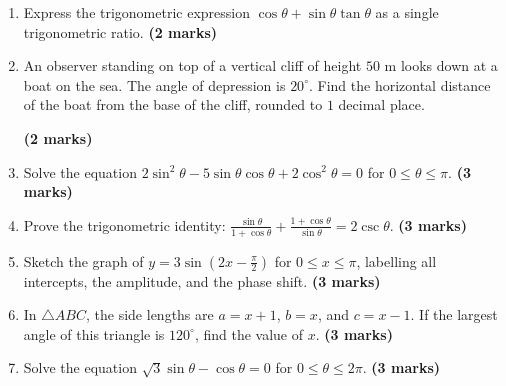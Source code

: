 \documentclass{article}
\begin{document}
\begin{enumerate}
    \item Express the trigonometric expression $\cos\theta + \sin\theta\tan\theta$ as a single trigonometric ratio. \hfill \textbf{(2 marks)}
    \vspace{0.5cm}

    \item An observer standing on top of a vertical cliff of height $50\text{ m}$ looks down at a boat on the sea. The angle of depression is $20^\circ$. Find the horizontal distance of the boat from the base of the cliff, rounded to $1$ decimal place.
    
     \hfill \textbf{(2 marks)}
    \vspace{0.5cm}

    \item Solve the equation $2\sin^2 \theta - 5\sin \theta \cos \theta + 2\cos^2 \theta = 0$ for $0 \le \theta \le \pi$. \hfill \textbf{(3 marks)}
    \vspace{0.5cm}

    \item Prove the trigonometric identity: $\frac{\sin \theta}{1 + \cos \theta} + \frac{1 + \cos \theta}{\sin \theta} = 2\csc \theta$. \hfill \textbf{(3 marks)}
    \vspace{0.5cm}

    \item Sketch the graph of $y = 3\sin\left(2x - \frac{\pi}{2}\right)$ for $0 \le x \le \pi$, labelling all intercepts, the amplitude, and the phase shift. \hfill \textbf{(3 marks)}
    \vspace{0.5cm}

    \item In $\triangle ABC$, the side lengths are $a = x+1$, $b = x$, and $c = x-1$. If the largest angle of this triangle is $120^\circ$, find the value of $x$. \hfill \textbf{(3 marks)}
    \vspace{0.5cm}

    \item Solve the equation $\sqrt{3}\sin\theta - \cos\theta = 0$ for $0 \le \theta \le 2\pi$. \hfill \textbf{(3 marks)}
    \vspace{0.5cm}


\end{enumerate}
\end{document}
